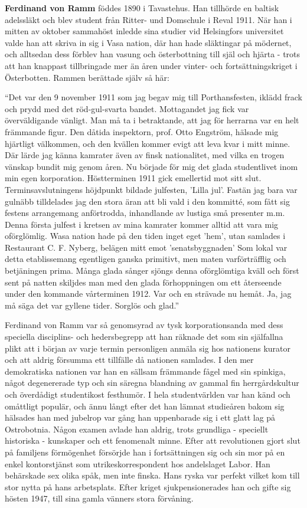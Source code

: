 {\footnotesize{\bf Ferdinand von Ramm} föddes 1890 i Tavastehus. Han tillhörde en baltisk 
adelssläkt och blev student från Ritter- und Domschule i Reval 1911.
När han i mitten av oktober sammahöst inledde sina studier vid 
Helsingfors universitet valde han att skriva in sig i Vasa nation, 
där han hade släktingar på mödernet, och alltsedan dess förblev han 
vasung och österbottning till själ och hjärta - trots att han knappast 
tillbringade mer än åren under vinter- och fortsättningskriget i 
Österbotten. Rammen berättade själv så här:

``Det var den 9 november 1911 som jag begav mig till
Porthansfesten, iklädd frack och prydd med det röd-gul-svarta
bandet. Mottagandet jag fick var överväldigande vänligt. Man
må ta i betraktande, att jag för herrarna var en helt främmande
figur. Den dåtida inspektorn, prof. Otto Engström, hälsade mig
hjärtligt välkommen, och den kvällen kommer evigt att leva kvar
i mitt minne. Där lärde jag känna kamrater även av finsk
nationalitet, med vilka en trogen vänskap bundit mig genom åren.
Nu började för mig det glada studentlivet inom min egen
korporation. Höstterminen 1911 gick emellertid mot sitt slut.
Terminsavslutningens höjdpunkt bildade julfesten, 'Lilla jul'.
Fastän jag bara var gulnäbb tilldelades jag den stora äran att bli
vald i den kommitté, som fått sig festens arrangemang
anförtrodda, inhandlande av lustiga små presenter m.m. Denna
första julfest i kretsen av mina kamrater kommer alltid att vara
mig oförglömlig. Wasa nation hade på den tiden inget eget 'hem',
utan samlades i Restaurant C. F. Nyberg, belägen mitt emot
'senatsbyggnaden' Som lokal var detta etablissemang egentligen
ganska primitivt, men maten varförträfflig och betjäningen prima.
Många glada sånger sjöngs denna oförglömtiga kväll och först
sent på natten skiljdes man med den glada förhoppningen om
ett återseende under den kommande vårterminen 1912. Var
och en strävade nu hemåt. Ja, jag må säga det var gyllene
tider. Sorglös och glad.''

Ferdinand von Ramm var så genomsyrad av tysk
korporationsanda med dess speciella disciplins- och
hedersbegrepp att han räknade det som sin själfallna plikt att
i början av varje termin personligen anmäla sig hos nationens
kurator och att aldrig försumma ett tillfälle då nationen samlades.
I den mer demokratiska nationen var han en sällsam främmande
fågel med sin spinkiga, något degenererade typ och sin säregna
blandning av gammal fin herrgårdskultur och överdådigt
studentikost festhumör. I hela studentvärlden var han känd och
omåttligt populär, och ännu långt efter det han lämnat studieåren
bakom sig hälsades han med jubelrop var gång han uppenbarade
sig i ett glatt lag på Ostrobotnia. Någon examen avlade han
aldrig, trots grundliga - speciellt historiska - kunskaper och ett
fenomenalt minne. Efter att revolutionen gjort slut på familjens
förmögenhet försörjde han i fortsättningen sig och sin mor på
en enkel kontorstjänst som utrikeskorrespondent hos
andelslaget Labor. Han behärskade sex olika spåk, men inte
finska. Hans ryska var perfekt vilket kom till stor nytta på hans
arbetsplats. Efter kriget sjukpensionerades han och gifte sig
hösten 1947, till sina gamla vänners stora förvåning.

}
